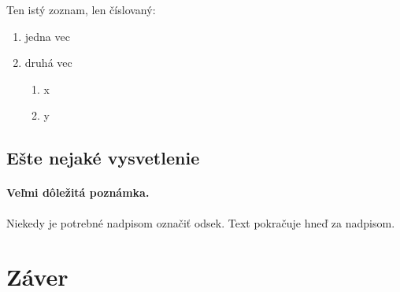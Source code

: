 \documentclass[10pt,twoside,slovak,a4paper]{article}
\begin{document}
Ten istý zoznam, len číslovaný:

\begin{enumerate}
\item jedna vec
\item druhá vec
	\begin{enumerate}
	\item x
	\item y
	\end{enumerate}
\end{enumerate}


\subsection{Ešte nejaké vysvetlenie} \label{ina:este}

\paragraph{Veľmi dôležitá poznámka.}
Niekedy je potrebné nadpisom označiť odsek. Text pokračuje hneď za nadpisom.



\section{Záver} \label{zaver} %






\end{document}
